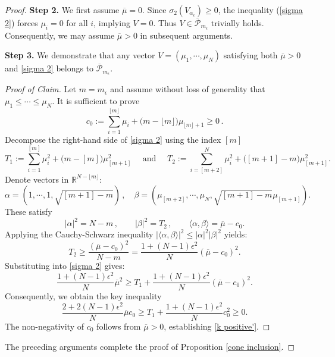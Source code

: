 \documentclass[10pt,a4paper]{amsart}
\begin{document}
\begin{proof}
\noindent\textbf{Step 2.} We first assume $\overline{\mu}=0$.
Since $\sigma_{2}(V_{\alpha_{\epsilon}})\geq 0$,  the inequality (\ref{sigma 2}) forces $\mu_{i}=0$ for all $i$, implying $V=0$. Thus $V\in \overline{\mathcal{P}}_{m_{\epsilon}}$ trivially holds. Consequently, we may assume $\overline{\mu}>0$ in subsequent arguments. 

\noindent\textbf{Step 3.} We demonstrate that any vector $V = (\mu_{1}, \cdots, \mu_{N})$ satisfying both $\overline{\mu}>0$ and \eqref{sigma 2} belongs to $\overline{\mathcal{P}}_{m_{\epsilon}}$.
\begin{proof}[Proof of Claim]

Let $m = m_{\epsilon}$ and assume without loss of generality that $\mu_{1} \leq \cdots \leq \mu_{N}$. 
 It is sufficient to prove
\begin{equation}\label{k positive'}
c_{0}:=\sum_{i=1}^{\lfloor m \rfloor}\mu_{i}+\big(m-\lfloor m \rfloor\big)\mu_{\lfloor m \rfloor+1}\geq 0\,.
\end{equation}
Decompose the right-hand side of \eqref{sigma 2} using the index $[m]$
$$T_{1}:=\sum_{i=1}^{[m]}\mu_{i}^{2}+\big(m-[m]\big)\mu_{[m+1]}^{2} \quad \textrm{ and } \quad T_{2}:=\sum_{i=[m+2]}^{N}\mu_{i}^{2}+\big([m+1]-m\big)\mu_{[m+1]}^{2}.$$
Denote vectors in $\mathbb{R}^{N - \lfloor m \rfloor}$:
$$ \alpha=(1,\cdots,1,\sqrt{[m+1]-m})\,, \quad \beta=(\mu_{[m+2]}, \cdots, \mu_{N}, \sqrt{[m+1]-m}\mu_{[m+1]}).$$ 
These satisfy
$$|\alpha|^2=N-m\,, \qquad |\beta|^2=T_{2}\,, \qquad \langle \alpha,\beta\rangle=\overline{\mu}-c_{0}.$$
Applying the Cauchy-Schwarz inequality $|\langle \alpha,\beta\rangle|^{2}\leq |\alpha|^{2}|\beta|^{2}$ yields: 
$$T_{2}\geq \frac{(\overline{\mu}-c_{0})^{2}}{N-m}=\frac{1+(N-1)\epsilon^2}{N}(\overline{\mu}-c_{0})^{2}.$$
Substituting into \eqref{sigma 2} gives:
$$\frac{1+(N-1)\epsilon^2}{N}\overline{\mu}^{2}\geq T_{1}+\frac{1+(N-1)\epsilon^2}{N}(\overline{\mu}-c_{0})^{2}.$$
Consequently, we obtain the key inequality
\begin{equation}\label{E1}
\frac{2 + 2(N-1)\epsilon^2}{N}\overline{\mu}c_{0} \geq T_{1} + \frac{1 + (N-1)\epsilon^2}{N}c_{0}^{2} \geq 0.
\end{equation}
The non-negativity of $c_{0}$ follows from $\overline{\mu} > 0$, establishing \eqref{k positive'}. 
\end{proof}
The preceding arguments complete the proof of Proposition \ref{cone inclusion}.
\end{proof}
\end{document}
